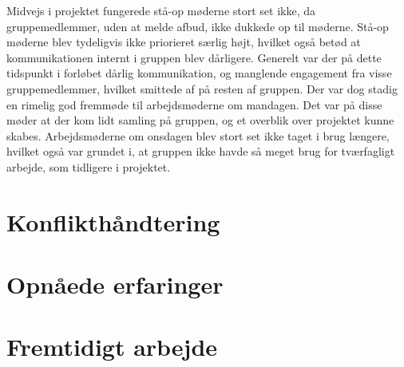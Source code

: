 Midvejs i projektet fungerede stå-op møderne stort set ikke, da gruppemedlemmer, uden at melde afbud, ikke dukkede op til møderne. Stå-op møderne blev tydeligvis ikke priorieret særlig højt, hvilket også betød at kommunikationen internt i gruppen blev dårligere. Generelt var der på dette tidspunkt i forløbet dårlig kommunikation, og manglende engagement fra visse gruppemedlemmer, hvilket smittede af på resten af gruppen.
Der var dog stadig en rimelig god fremmøde til arbejdsmøderne om mandagen. Det var på disse møder at der kom lidt samling på gruppen, og et overblik over projektet kunne skabes. Arbejdsmøderne om onsdagen blev stort set ikke taget i brug længere, hvilket også var grundet i, at gruppen ikke havde så meget brug for tværfagligt arbejde, som tidligere i projektet.

\section*{Konflikthåndtering}

\section*{Opnåede erfaringer}

\section*{Fremtidigt arbejde}